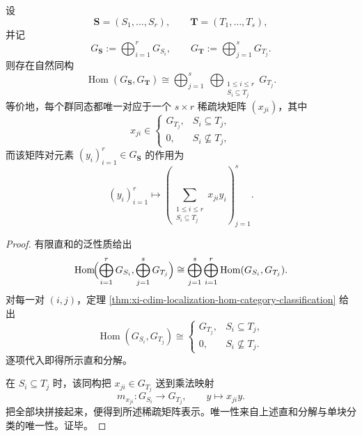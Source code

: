\begin{theorem}\label{thm:xi-localized-directsum-hom-sparse-matrix}
设
\[
\mathbf S=(S_1,\dots,S_r),
\qquad
\mathbf T=(T_1,\dots,T_s),
\]
并记
\[
G_{\mathbf S}:=\bigoplus_{i=1}^{r}G_{S_i},
\qquad
G_{\mathbf T}:=\bigoplus_{j=1}^{s}G_{T_j}.
\]
则存在自然同构
\[
\operatorname{Hom}(G_{\mathbf S},G_{\mathbf T})
\cong
\bigoplus_{j=1}^{s}\ \bigoplus_{\substack{1\le i\le r\\ S_i\subseteq T_j}} G_{T_j}.
\]
等价地，每个群同态都唯一对应于一个 \(s\times r\) 稀疏块矩阵 \((x_{ji})\)，其中
\[
x_{ji}\in
\begin{cases}
G_{T_j},& S_i\subseteq T_j,\\
0,& S_i\not\subseteq T_j,
\end{cases}
\]
而该矩阵对元素 \((y_i)_{i=1}^{r}\in G_{\mathbf S}\) 的作用为
\[
(y_i)_{i=1}^{r}
\longmapsto
\left(
\sum_{\substack{1\le i\le r\\ S_i\subseteq T_j}}x_{ji}y_i
\right)_{j=1}^{s}.
\]
\end{theorem}
\begin{proof}
有限直和的泛性质给出
\[
\operatorname{Hom}\!\Bigl(\bigoplus_{i=1}^{r}G_{S_i},\bigoplus_{j=1}^{s}G_{T_j}\Bigr)
\cong
\bigoplus_{j=1}^{s}\bigoplus_{i=1}^{r}\operatorname{Hom}(G_{S_i},G_{T_j}).
\]
对每一对 \((i,j)\)，定理 \ref{thm:xi-cdim-localization-hom-category-classification} 给出
\[
\operatorname{Hom}(G_{S_i},G_{T_j})
\cong
\begin{cases}
G_{T_j},& S_i\subseteq T_j,\\[1mm]
0,& S_i\not\subseteq T_j.
\end{cases}
\]
逐项代入即得所示直和分解。

在 \(S_i\subseteq T_j\) 时，该同构把 \(x_{ji}\in G_{T_j}\) 送到乘法映射
\[
m_{x_{ji}}:G_{S_i}\to G_{T_j},
\qquad
y\mapsto x_{ji}y.
\]
把全部块拼接起来，便得到所述稀疏矩阵表示。唯一性来自上述直和分解与单块分类的唯一性。证毕。
\end{proof}

